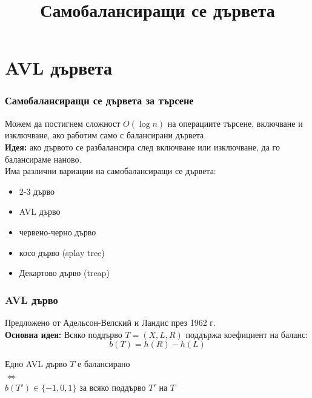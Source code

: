 \documentclass[alsotrans,beameroptions={aspectratio=169}]{beamerswitch}
\title{Самобалансиращи се дървета}
\begin{document}
\begin{frame}
  \titlepage
\end{frame}

\section{AVL дървета}

\begin{frame}
  \frametitle{Самобалансиращи се дървета за търсене}
  Можем да постигнем сложност $O(\log n)$ на операциите търсене, включване и изключване, ако работим само с балансирани дървета.\\[2ex]
  \pause
  \textbf{Идея:} ако дървото се разбалансира след включване или изключване, да го балансираме наново.\\[2ex]
  \pause
  Има различни вариации на самобалансиращи се дървета:
  \begin{itemize}
  \item 2-3 дърво
  \item<alert@4> AVL дърво
  \item червено-черно дърво
  \item косо дърво (splay tree)
  \item Декартово дърво (treap)
  \end{itemize}
  \pause
\end{frame}

\begin{frame}
  \frametitle{AVL дърво}
  Предложено от Адельсон-Велский и Ландис през 1962 г.\\[2ex]
  \textbf{Основна идея:} Всяко поддърво $T = (X,L,R)$ поддържа коефициент на баланс:
  \begin{equation*}
    b(T) = h(R) - h(L)
  \end{equation*}
  \pause
  \begin{block}{}
    \begin{center}
      Едно AVL дърво $T$ е балансирано\\
      $\Longleftrightarrow$\\
      $b(T') \in \{-1,0,1\}$ за всяко поддърво $T'$ на $T$
    \end{center}
  \end{block}
\end{frame}
\end{document}
